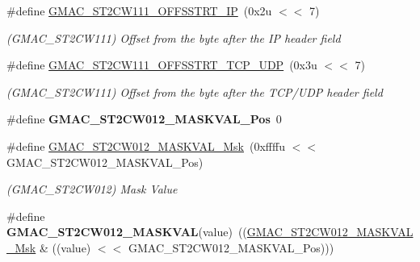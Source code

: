 \begin{DoxyCompactItemize}
\mbox{\label{group__SAMV71__GMAC_ga8140277da037ab04dcfb9fc80ad90688}} 
\#define \mbox{\hyperlink{group__SAMV71__GMAC_ga8140277da037ab04dcfb9fc80ad90688}{G\+M\+A\+C\+\_\+\+S\+T2\+C\+W111\+\_\+\+O\+F\+F\+S\+S\+T\+R\+T\+\_\+\+IP}}~(0x2u $<$$<$ 7)
\begin{DoxyCompactList}\small\item\em (G\+M\+A\+C\+\_\+\+S\+T2\+C\+W111) Offset from the byte after the IP header field \end{DoxyCompactList}\item 
\mbox{\label{group__SAMV71__GMAC_gac168aa5aa65d6bbe4bb8ae1653b996aa}} 
\#define \mbox{\hyperlink{group__SAMV71__GMAC_gac168aa5aa65d6bbe4bb8ae1653b996aa}{G\+M\+A\+C\+\_\+\+S\+T2\+C\+W111\+\_\+\+O\+F\+F\+S\+S\+T\+R\+T\+\_\+\+T\+C\+P\+\_\+\+U\+DP}}~(0x3u $<$$<$ 7)
\begin{DoxyCompactList}\small\item\em (G\+M\+A\+C\+\_\+\+S\+T2\+C\+W111) Offset from the byte after the T\+C\+P/\+U\+DP header field \end{DoxyCompactList}\item 
\mbox{\label{group__SAMV71__GMAC_ga264c2920d8e45dcfeff24e457aa964fe}} 
\#define {\bfseries G\+M\+A\+C\+\_\+\+S\+T2\+C\+W012\+\_\+\+M\+A\+S\+K\+V\+A\+L\+\_\+\+Pos}~0
\item 
\mbox{\label{group__SAMV71__GMAC_gae71b5f1afe11aa266ba544e8866f9b2f}} 
\#define \mbox{\hyperlink{group__SAMV71__GMAC_gae71b5f1afe11aa266ba544e8866f9b2f}{G\+M\+A\+C\+\_\+\+S\+T2\+C\+W012\+\_\+\+M\+A\+S\+K\+V\+A\+L\+\_\+\+Msk}}~(0xffffu $<$$<$ G\+M\+A\+C\+\_\+\+S\+T2\+C\+W012\+\_\+\+M\+A\+S\+K\+V\+A\+L\+\_\+\+Pos)
\begin{DoxyCompactList}\small\item\em (G\+M\+A\+C\+\_\+\+S\+T2\+C\+W012) Mask Value \end{DoxyCompactList}\item 
\mbox{\label{group__SAMV71__GMAC_ga030b951682387a33da498bd1502d7537}} 
\#define {\bfseries G\+M\+A\+C\+\_\+\+S\+T2\+C\+W012\+\_\+\+M\+A\+S\+K\+V\+AL}(value)~((\mbox{\hyperlink{group__SAMV71__GMAC_gae71b5f1afe11aa266ba544e8866f9b2f}{G\+M\+A\+C\+\_\+\+S\+T2\+C\+W012\+\_\+\+M\+A\+S\+K\+V\+A\+L\+\_\+\+Msk}} \& ((value) $<$$<$ G\+M\+A\+C\+\_\+\+S\+T2\+C\+W012\+\_\+\+M\+A\+S\+K\+V\+A\+L\+\_\+\+Pos)))

\end{DoxyCompactItemize}
